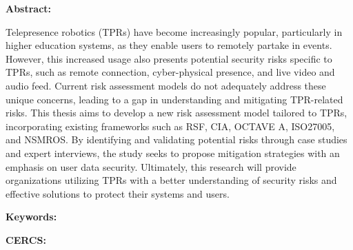 
\newpage
\noindent\textbf{\large {\thesisTitle}}

\vspace*{3ex}

\noindent\textbf{Abstract:}
\vspace{-1ex}

Telepresence robotics (TPRs) have become increasingly popular, particularly
in higher education systems, as they enable users to remotely partake in
events. However, this increased usage also presents potential security risks
specific to TPRs, such as remote connection, cyber-physical presence, and
live video and audio feed. Current risk assessment models do not adequately
address these unique concerns, leading to a gap in understanding and
mitigating TPR-related risks. This thesis aims to develop a new risk
assessment model tailored to TPRs, incorporating existing frameworks such as
RSF, CIA, OCTAVE A, ISO27005, and NSMROS. By identifying and validating
potential risks through case studies and expert interviews, the study seeks
to propose mitigation strategies with an emphasis on user data security.
Ultimately, this research will provide organizations utilizing TPRs with a
better understanding of security risks and effective solutions to protect
their systems and users.

\vspace*{1ex}

\noindent\textbf{Keywords:} {\thesisKeywords}

\vspace*{1ex}

\noindent\textbf{CERCS:}

\vspace*{1ex}
